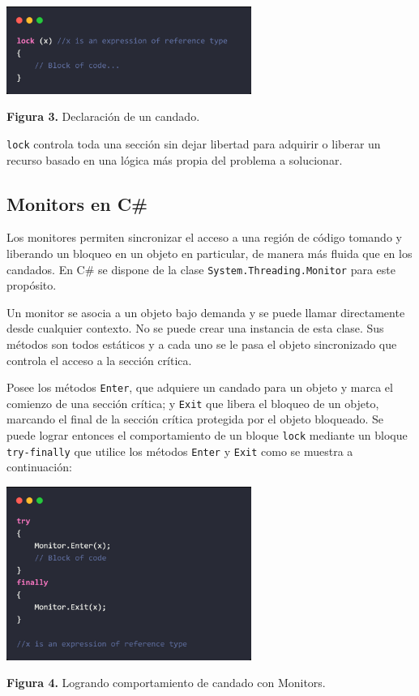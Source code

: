 \documentclass[10pt]{article} %
\newcommand{\csl}[1]{\colorbox{backcolour}{\texttt{#1}}}
\newcommand{\imgcaption}[2]{\tiny \textbf{Figura #1.} #2.}
\begin{document}
\begin{center}
	\includegraphics[width=8cm]{lock.jpg}
	
	\imgcaption{3}{Declaraci\'on de un candado}
\end{center}

\csl{lock} controla toda una secci\'on sin dejar libertad para adquirir o liberar un recurso basado en una l\'ogica m\'as propia del problema a solucionar. 

\subsection{Monitors en C\#}

Los monitores permiten sincronizar el acceso a una región de código tomando y liberando un bloqueo en un objeto en particular, de manera m\'as fluida que en los candados. En C\# se dispone de la clase \csl{System.Threading.Monitor} para este prop\'osito.

Un monitor se asocia a un objeto bajo demanda y se puede llamar directamente desde cualquier contexto. No se puede crear una instancia de esta clase. Sus métodos son todos estáticos y a cada uno se le pasa el objeto sincronizado que controla el acceso a la sección crítica.

Posee los m\'etodos \csl{Enter}, que adquiere un candado para un objeto y marca el comienzo de una sección crítica; y \csl{Exit}
que libera el bloqueo de un objeto, marcando el final de la sección crítica protegida por el objeto bloqueado. Se puede lograr entonces el comportamiento de un bloque \csl{lock} mediante un bloque \csl{try-finally} que utilice los m\'etodos \csl{Enter} y \csl{Exit} como se muestra a continuaci\'on:

\begin{center}
	\includegraphics[width=8cm]{monitor.jpg} 
	
	\imgcaption{4}{Logrando comportamiento de candado con Monitors}
\end{center}
\end{document}
